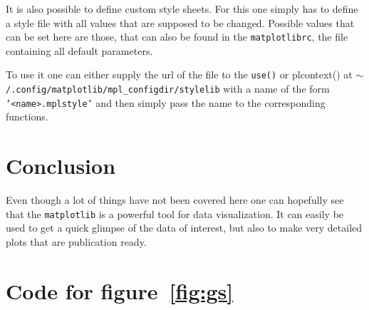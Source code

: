 \documentclass[a4paper, 11pt, onecolumn]{article}
\newcommand{\mpl}{\texttt{matplotlib}\xspace}
\newcommand{\pl}[1]{\mbox{\texttt{#1}\xspace}}
\newcommand{\baseref}[3]{\mbox{#1 \ref{#2:#3}\xspace}}
\newcommand{\fig}[1]{\baseref{figure}{fig}{#1}}
\begin{document}
It is also possible to define custom style sheets. For this one simply has to
define a style file with all values that are supposed to be changed. Possible
values that can be set here are those, that can also be found in the 
\pl{matplotlibrc}, the file containing all default parameters.

To use it one can either supply the url of the file to the \pl{use()} or
pl{context()} at \pl{$\sim$/.config/matplotlib/mpl\_configdir/stylelib} with a
name of the form \pl{'<name>.mplstyle'} and then simply pass the name to the
corresponding functions.


\section{Conclusion}

Even though a lot of things have not been covered here one can hopefully see
that the \mpl is a powerful tool for data visualization. It can easily be used
to get a quick glimpse of the data of interest, but also to make very detailed
plots that are publication ready.


\section{Code for \fig{gs}}
\label{sec:gs}

\inputminted[linenos, mathescape]{python}{grid_spec.py}

{}

\end{document}
